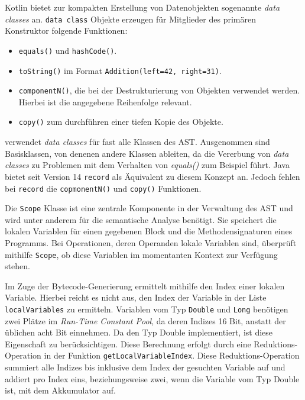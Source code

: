 Kotlin bietet zur kompakten Erstellung von Datenobjekten sogenannte \textit{data classes} an. \texttt{data class} Objekte erzeugen für Mitglieder des primären Konstruktor folgende Funktionen:

\begin{itemize}
    \item \texttt{equals()} und \texttt{hashCode()}.
    \item \texttt{toString()} im Format \texttt{Addition(left=42, right=31)}.
    \item \texttt{componentN()}, die bei der Destrukturierung von Objekten verwendet werden. Hierbei ist die angegebene Reihenfolge relevant.
    \item \texttt{copy()} zum durchführen einer tiefen Kopie des Objekte.
\end{itemize}

\Toya verwendet \textit{data classes} für fast alle Klassen des AST. Ausgenommen sind Basisklassen, von denenen andere Klassen ableiten, da die Vererbung von \textit{data classes} zu Problemen mit dem Verhalten von \textit{equals()} zum Beispiel führt. Java bietet seit Version 14 \texttt{record} als Äquivalent zu diesem Konzept an. Jedoch fehlen bei \texttt{record} die \texttt{copmonentN()} und \texttt{copy()} Funktionen.

Die \texttt{Scope} Klasse ist eine zentrale Komponente in der Verwaltung des AST und wird unter anderem für die semantische Analyse benötigt. Sie speichert die lokalen Variablen für einen gegebenen Block und die Methodensignaturen eines \toya Programms. Bei Operationen, deren Operanden lokale Variablen sind, überprüft \toya mithilfe \texttt{Scope}, ob diese Variablen im momentanten Kontext zur Verfügung stehen.

Im Zuge der Bytecode-Generierung ermittelt \toya mithilfe \scope den Index einer lokalen Variable. Hierbei reicht es nicht aus, den Index der Variable in der Liste \texttt{localVariables} zu ermitteln. Variablen vom Typ \texttt{Double} und \texttt{Long} benötigen zwei Plätze im \textit{Run-Time Constant Pool}, da deren Indizes 16 Bit, anstatt der üblichen acht Bit einnehmen. Da \toya den Typ Double implementiert, ist diese Eigenschaft zu berücksichtigen. Diese Berechnung erfolgt durch eine Reduktions-Operation in der Funktion \texttt{getLocalVariableIndex}. Diese Reduktions-Operation summiert alle Indizes bis inklusive dem Index der gesuchten Variable auf und addiert pro Index eins, beziehungsweise zwei, wenn die Variable vom Typ Double ist, mit dem Akkumulator auf.

